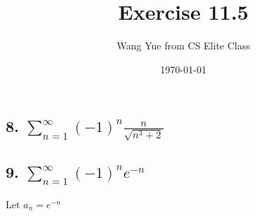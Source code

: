 \documentclass{article}
\begin{document}
    \title{Exercise 11.5}
    \author{Wang Yue from CS Elite Class}
    \date{\today}

    \maketitle

    \subsection*{8. $\sum_{n=1}^\infty (-1)^n \frac{n}{\sqrt{n^3+2}}$}
    

    \subsection*{9. $\sum_{n=1}^\infty (-1)^n e^{-n}$}

    Let $a_n = e^{-n}$
\end{document}
